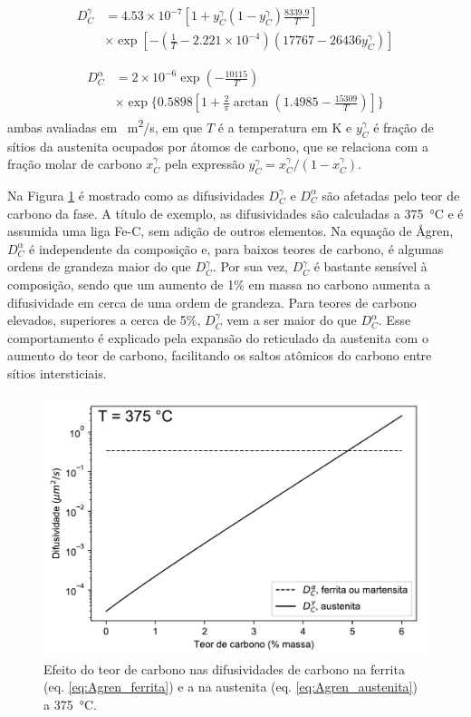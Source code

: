 \begin{align}
  D_C^\gamma &= 4.53 \times 10^{-7} \left[ 1 + y_C^\gamma \left(1 - y_C^\gamma\right) \frac{8339.9}{T} \right] \nonumber \\
  & \times \exp \left[ - \left( \frac{1}{T} - 2.221 \times 10^{-4} \right) \left( 17767 - 26436 y_C^\gamma \right) \right] \label{eq:Agren_austenita}
\end{align}

\begin{align}
  D_C^\alpha &= 2 \times 10^{-6} \exp \left(-\frac{10115}{T} \right) \nonumber \\
  & \times \exp \Bigg\{0.5898 \left[1 + \frac{2}{\pi} \arctan \left(1.4985 - \frac{15309}{T}\right)\right] \Bigg\} \label{eq:Agren_ferrita}
\end{align}
%
ambas avaliadas em \SI{}{m^2/s}, em que $T$ é a temperatura em K e $y_C^\gamma$ é fração de sítios da austenita ocupados por átomos de carbono, que se relaciona com a fração molar de carbono $x_C^\gamma$ pela expressão $y_C^\gamma = x_C^\gamma / (1 - x_C^\gamma)$.

Na Figura \ref{fig:difusividades} é mostrado como as difusividades $D_C^\gamma$ e $D_C^\alpha$ são afetadas pelo teor de carbono da fase. A título de exemplo, as difusividades são calculadas a \SI{375}{\degreeCelsius} e é assumida uma liga Fe-C, sem adição de outros elementos. Na equação de {\AA}gren, $D_C^\alpha$ é independente da composição e, para baixos teores de carbono, é algumas ordens de grandeza maior do que $D_C^\gamma$. Por sua vez, $D_C^\gamma$ é bastante sensível à composição, sendo que um aumento de 1\% em massa no carbono aumenta a difusividade em cerca de uma ordem de grandeza. Para teores de carbono elevados, superiores a cerca de 5\%, $D_C^\gamma$ vem a ser maior do que $D_C^\alpha$. Esse comportamento é explicado pela expansão do reticulado da austenita com o aumento do teor de carbono, facilitando os saltos atômicos do carbono entre sítios intersticiais. %

\begin{figure}
  \includegraphics[width=.8\textwidth]{img/difusividades_carbono.pdf}
  \caption{Efeito do teor de carbono nas difusividades de carbono na ferrita (eq. \ref{eq:Agren_ferrita}) e a na austenita (eq. \ref{eq:Agren_austenita}) a \SI{375}{\degreeCelsius}.}
  \label{fig:difusividades}
\end{figure}

